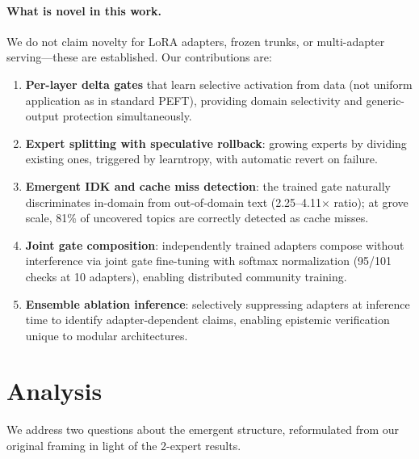 \documentclass{article}
\begin{document}
\paragraph{What is novel in this work.}
We do not claim novelty for LoRA adapters, frozen trunks, or multi-adapter
serving---these are established. Our contributions are:
\begin{enumerate}[nosep]
\item \textbf{Per-layer delta gates} that learn selective activation from
      data (not uniform application as in standard PEFT), providing
      domain selectivity and generic-output protection simultaneously.
\item \textbf{Expert splitting with speculative rollback}: growing experts
      by dividing existing ones, triggered by learntropy, with automatic
      revert on failure.
\item \textbf{Emergent IDK and cache miss detection}: the trained gate
      naturally discriminates in-domain from out-of-domain text
      (2.25--4.11$\times$ ratio); at grove scale, 81\% of uncovered
      topics are correctly detected as cache misses.
\item \textbf{Joint gate composition}: independently trained adapters
      compose without interference via joint gate fine-tuning with softmax
      normalization (95/101 checks at 10 adapters), enabling distributed
      community training.
\item \textbf{Ensemble ablation inference}: selectively suppressing
      adapters at inference time to identify adapter-dependent claims,
      enabling epistemic verification unique to modular architectures.
\end{enumerate}

\section{Analysis}
\label{sec:analysis}

We address two questions about the emergent structure, reformulated from
our original framing in light of the 2-expert results.
\end{document}
